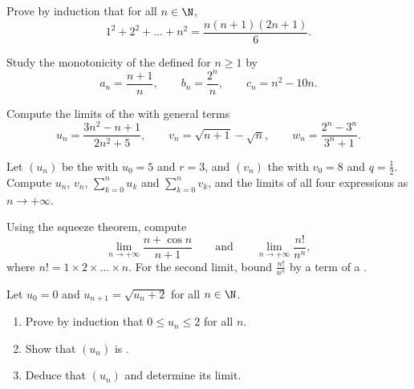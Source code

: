 \begin{exercise}[$\star$]\label{exo:g12:seq:1}
Prove by induction that for all $n \in \N$,
\[
1^2 + 2^2 + \dots + n^2 = \frac{n(n+1)(2n+1)}{6}.
\]
\end{exercise}

\begin{exercise}[$\star$]\label{exo:g12:seq:2}
Study the monotonicity of the  defined for $n \geq 1$ by
\[
a_n = \frac{n+1}{n}, \qquad
b_n = \frac{2^n}{n}, \qquad
c_n = n^2 - 10n .
\]
\end{exercise}

\begin{exercise}[$\star$]\label{exo:g12:seq:3}
Compute the limits of the  with general terms
\[
u_n = \frac{3n^2 - n + 1}{2n^2 + 5}, \qquad
v_n = \sqrt{n+1} - \sqrt{n}, \qquad
w_n = \frac{2^n - 3^n}{3^n + 1}.
\]
\end{exercise}

\begin{exercise}[$\star$]\label{exo:g12:seq:4}
Let $(u_n)$ be the  with $u_0 = 5$ and 
$r = 3$, and $(v_n)$ the  with $v_0 = 8$ and 
$q = \frac{1}{2}$. Compute $u_n$, $v_n$, $\sum_{k=0}^{n} u_k$ and
$\sum_{k=0}^{n} v_k$, and the limits of all four expressions as
$n \to +\infty$.
\end{exercise}

\begin{exercise}[$\star\star$]\label{exo:g12:seq:5}
Using the squeeze theorem, compute
\[
\lim_{n\to+\infty} \frac{n + \cos n}{n + 1}
\qquad\text{and}\qquad
\lim_{n\to+\infty} \frac{n!}{n^n},
\]
where $n! = 1 \times 2 \times \dots \times n$. For the second limit, bound
$\frac{n!}{n^n}$ by a term of a .
\end{exercise}

\begin{exercise}[$\star\star$]\label{exo:g12:seq:6}
Let $u_0 = 0$ and $u_{n+1} = \sqrt{u_n + 2}$ for all $n \in \N$.
\begin{enumerate}
  \item Prove by induction that $0 \leq u_n \leq 2$ for all $n$.
  \item Show that $(u_n)$ is .
  \item Deduce that $(u_n)$  and determine its limit.
\end{enumerate}
\end{exercise}

